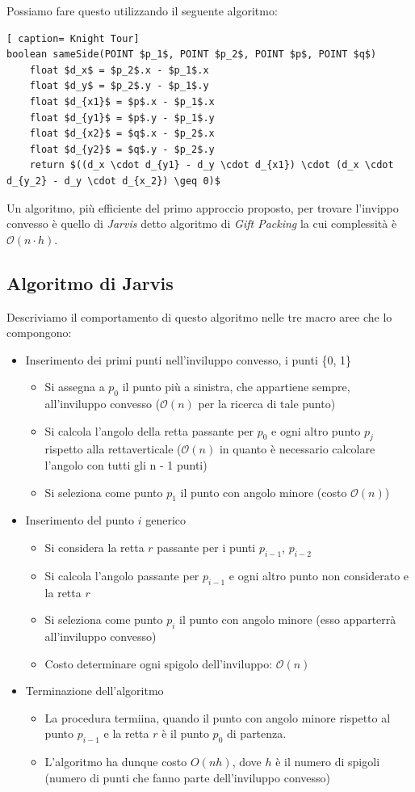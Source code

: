 \documentclass[../cheatSheetAlgoritmi.tex]{subfiles}
\begin{document}
Possiamo fare questo utilizzando il seguente algoritmo:
 \begin{lstlisting}[ caption= Knight Tour]
boolean sameSide(POINT $p_1$, POINT $p_2$, POINT $p$, POINT $q$)
	float $d_x$ = $p_2$.x - $p_1$.x
	float $d_y$ = $p_2$.y - $p_1$.y
	float $d_{x1}$ = $p$.x - $p_1$.x
	float $d_{y1}$ = $p$.y - $p_1$.y
	float $d_{x2}$ = $q$.x - $p_2$.x
	float $d_{y2}$ = $q$.y - $p_2$.y
	return $((d_x \cdot d_{y1} - d_y \cdot d_{x1}) \cdot (d_x \cdot d_{y_2} - d_y \cdot d_{x_2}) \geq 0)$
\end{lstlisting}
Un algoritmo, più efficiente del primo approccio proposto, per trovare l'invippo convesso è quello di \emph{Jarvis} detto algoritmo di \emph{Gift Packing} la cui complessità è $\mathcal{O}(n \cdot h)$.
\subsection{Algoritmo di Jarvis}
Descriviamo il comportamento di questo algoritmo nelle tre macro aree che lo compongono:
\begin{itemize}
\item Inserimento dei primi punti nell'inviluppo convesso, i punti \{0, 1\}
	\begin{itemize}
		\item Si assegna a $p_0$ il punto più a sinistra, che appartiene sempre, all'inviluppo convesso ($\mathcal{O}(n)$ per la ricerca di tale punto)
		\item Si calcola l'angolo della retta passante per $p_0$ e ogni altro punto $p_{j}$ rispetto alla rettaverticale ($\mathcal{O}(n)$ in quanto è necessario calcolare l'angolo con tutti gli n - 1 punti)
		\item Si seleziona come punto $p_1$ il punto con angolo minore (costo $\mathcal{O}(n)$)
	\end{itemize}
\item Inserimento del punto $i$ generico
	\begin{itemize}
		\item Si considera la retta $r$ passante per i punti $p_{i - 1}$, $p_{i - 2}$
		\item Si calcola l'angolo passante per $p_{i - 1}$ e ogni altro punto non considerato e la retta $r$
		\item Si seleziona come punto $p_i$ il punto con angolo minore (esso apparterrà all'inviluppo convesso)
		\item Costo determinare ogni spigolo dell'inviluppo: $\mathcal{O}(n)$
	\end{itemize}
\item Terminazione dell'algoritmo
	\begin{itemize}
		\item La procedura termiina, quando il punto con angolo minore rispetto al punto $p_{i-1}$ e la retta $r$ è il punto $p_0$ di partenza.
		\item L'algoritmo ha dunque costo $O(nh)$, dove $h$ è il numero di spigoli (numero di punti che fanno parte dell'inviluppo convesso)
	\end{itemize}
\end{itemize} 
\end{document}

